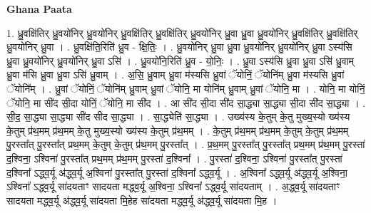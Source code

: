 \documentclass[17pt]{extarticle}
\begin{document}
\textbf{Ghana Paata } \newline

1. ध्रु॒वक्षि॑तिर् ध्रु॒वयो॑निर् ध्रु॒वयो॑निर् ध्रु॒वक्षि॑तिर् ध्रु॒वक्षि॑तिर् ध्रु॒वयो॑निर् ध्रु॒वा ध्रु॒वा ध्रु॒वयो॑निर् ध्रु॒वक्षि॑तिर् ध्रु॒वक्षि॑तिर् ध्रु॒वयो॑निर् ध्रु॒वा । . ध्रु॒वक्षि॑ति॒रिति॑ ध्रु॒व - क्षि॒तिः॒ । . ध्रु॒वयो॑निर् ध्रु॒वा ध्रु॒वा ध्रु॒वयो॑निर् ध्रु॒वयो॑निर् ध्रु॒वा ऽस्य॑सि ध्रु॒वा ध्रु॒वयो॑निर् ध्रु॒वयो॑निर् ध्रु॒वा ऽसि॑ । . ध्रु॒वयो॑नि॒रिति॑ ध्रु॒व - यो॒निः॒ । . ध्रु॒वा ऽस्य॑सि ध्रु॒वा ध्रु॒वा ऽसि॑ ध्रु॒वाम् ध्रु॒वा म॑सि ध्रु॒वा ध्रु॒वा ऽसि॑ ध्रु॒वाम् । . अ॒सि॒ ध्रु॒वाम् ध्रु॒वा म॑स्यसि ध्रु॒वां ॅयोनिं॒ ॅयोनि॑म् ध्रु॒वा म॑स्यसि ध्रु॒वां ॅयोनि᳚म् । . ध्रु॒वां ॅयोनिं॒ ॅयोनि॑म् ध्रु॒वाम् ध्रु॒वां ॅयोनि॒ मा योनि॑म् ध्रु॒वाम् ध्रु॒वां ॅयोनि॒ मा । . योनि॒ मा योनिं॒ ॅयोनि॒ मा सी॑द सी॒दा योनिं॒ ॅयोनि॒ मा सी॑द । . आ सी॑द सी॒दा सी॑द सा॒द्ध्या सा॒द्ध्या सी॒दा सी॑द सा॒द्ध्या । . सी॒द॒ सा॒द्ध्या सा॒द्ध्या सी॑द सीद सा॒द्ध्या । . सा॒द्ध्येति॑ सा॒द्ध्या । . उख्य॑स्य के॒तुम् के॒तु मुख्य॒स्यो ख्य॑स्य के॒तुम् प्र॑थ॒मम् प्र॑थ॒मम् के॒तु मुख्य॒स्यो ख्य॑स्य के॒तुम् प्र॑थ॒मम् । . के॒तुम् प्र॑थ॒मम् प्र॑थ॒मम् के॒तुम् के॒तुम् प्र॑थ॒मम् पु॒रस्ता᳚त् पु॒रस्ता᳚त् प्रथ॒मम् के॒तुम् के॒तुम् प्र॑थ॒मम् पु॒रस्ता᳚त् । . प्र॒थ॒मम् पु॒रस्ता᳚त् पु॒रस्ता᳚त् प्रथ॒मम् प्र॑थ॒मम् पु॒रस्ता॑ द॒श्विना॒ ऽश्विना॑ पु॒रस्ता᳚त् प्रथ॒मम् प्र॑थ॒मम् पु॒रस्ता॑ द॒श्विना᳚ । . पु॒रस्ता॑ द॒श्विना॒ ऽश्विना॑ पु॒रस्ता᳚त् पु॒रस्ता॑ द॒श्विना᳚ ऽद्ध्व॒र्यू अ॑द्ध्व॒र्यू अ॒श्विना॑ पु॒रस्ता᳚त् पु॒रस्ता॑ द॒श्विना᳚ ऽद्ध्व॒र्यू । . अ॒श्विना᳚ ऽद्ध्व॒र्यू अ॑द्ध्व॒र्यू अ॒श्विना॒ ऽश्विना᳚ ऽद्ध्व॒र्यू सा॑दयताꣳ सादयता मद्ध्व॒र्यू अ॒श्विना॒ ऽश्विना᳚ ऽद्ध्व॒र्यू सा॑दयताम् । . अ॒द्ध्व॒र्यू सा॑दयताꣳ सादयता मद्ध्व॒र्यू अ॑द्ध्व॒र्यू सा॑दयता मि॒हेह सा॑दयता मद्ध्व॒र्यू अ॑द्ध्व॒र्यू सा॑दयता मि॒ह । \newline
\end{document}
